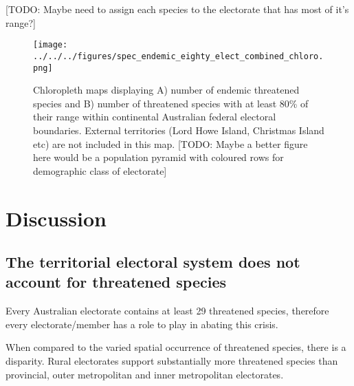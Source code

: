 \documentclass[a4paper,11pt]{article}
\begin{document}

[TODO: Maybe need to assign each species to the electorate that has most of it's range?]

\begin{figure}[H]
	\centering
    \texttt{[image: ../../../figures/spec\_endemic\_eighty\_elect\_combined\_chloro.png]}
    \caption{Chloropleth maps displaying A) number of endemic threatened species and B) number of threatened species with at least 80\% of their range within continental Australian federal electoral boundaries. External territories (Lord Howe Island, Christmas Island etc) are not included in this map. [TODO: Maybe a better figure here would be a population pyramid with coloured rows for demographic class of electorate]}
    \label{fig:combined_chloro}
\end{figure}




\section{Discussion}


\subsection{The territorial electoral system does not account for threatened species}

Every Australian electorate contains at least 29 threatened species, therefore every electorate/member has a role to play in abating this crisis.

When compared to the varied spatial occurrence of threatened species, there is a disparity. Rural electorates support substantially more threatened species than provincial, outer metropolitan and inner metropolitan electorates.
\end{document}
